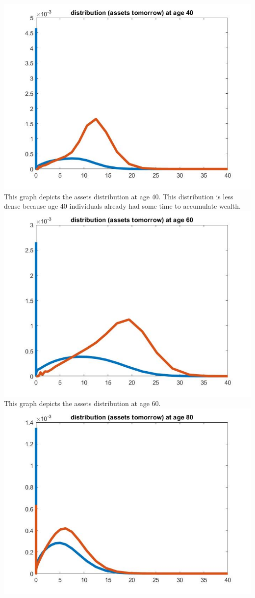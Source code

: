 \documentclass[12pt,a4paper]{article}
\begin{document}
\includegraphics[width=14cm]{Graphs/Figure3} \\
This graph depicts the assets distribution at age 40. This distribution is less dense because age 40 individuals already had some time to accumulate wealth. \\
\includegraphics[width=14cm]{Graphs/Figure4} \\
This graph depicts the assets distribution at age 60.\\
\includegraphics[width=14cm]{Graphs/Figure5} \\
\end{document}
